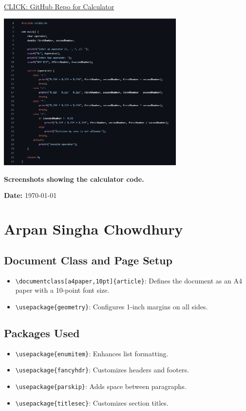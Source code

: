 \documentclass[a4paper,12pt]{article}
\begin{document}
\href{https://github.com/Nehaaa05/calculator/blob/main/calculator.c}{CLICK: GitHub Repo for Calculator}
\par\vspace{2em}
\includegraphics[width=0.7\textwidth]{ccalcula.png}
\par\vspace{2em}
\large\textbf{Screenshots showing the calculator code.}
\par\vspace{2em}
\vspace{0.3in}


\newpage
{ \textbf{Date:} \today}
\section{Arpan Singha Chowdhury}
\subsection{Document Class and Page Setup}
\begin{itemize}
    \item \texttt{\textbackslash documentclass[a4paper,10pt]\{article\}}: Defines the document as an A4 paper with a 10-point font size.
    \item \texttt{\textbackslash usepackage\{geometry\}}: Configures 1-inch margins on all sides.
\end{itemize}

\subsection{Packages Used}
\begin{itemize}
    \item \texttt{\textbackslash usepackage\{enumitem\}}: Enhances list formatting.
    \item \texttt{\textbackslash usepackage\{fancyhdr\}}: Customizes headers and footers.
    \item \texttt{\textbackslash usepackage\{parskip\}}: Adds space between paragraphs.
    \item \texttt{\textbackslash usepackage\{titlesec\}}: Customizes section titles.
\end{itemize}
\end{document}
